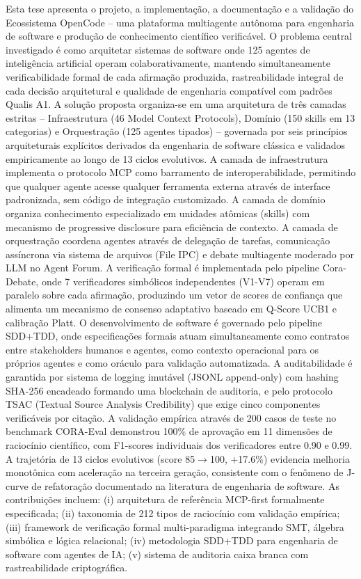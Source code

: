 \documentclass[12pt,a4paper,sumario=tradicional,openany]{abntex2}
\begin{document}
Esta tese apresenta o projeto, a implementação, a documentação e a validação do Ecossistema OpenCode -- uma plataforma multiagente autônoma para engenharia de software e produção de conhecimento científico verificável. O problema central investigado é como arquitetar sistemas de software onde 125 agentes de inteligência artificial operam colaborativamente, mantendo simultaneamente verificabilidade formal de cada afirmação produzida, rastreabilidade integral de cada decisão arquitetural e qualidade de engenharia compatível com padrões Qualis A1. A solução proposta organiza-se em uma arquitetura de três camadas estritas -- Infraestrutura (46 Model Context Protocols), Domínio (150 skills em 13 categorias) e Orquestração (125 agentes tipados) -- governada por seis princípios arquiteturais explícitos derivados da engenharia de software clássica e validados empiricamente ao longo de 13 ciclos evolutivos. A camada de infraestrutura implementa o protocolo MCP como barramento de interoperabilidade, permitindo que qualquer agente acesse qualquer ferramenta externa através de interface padronizada, sem código de integração customizado. A camada de domínio organiza conhecimento especializado em unidades atômicas (skills) com mecanismo de progressive disclosure para eficiência de contexto. A camada de orquestração coordena agentes através de delegação de tarefas, comunicação assíncrona via sistema de arquivos (File IPC) e debate multiagente moderado por LLM no Agent Forum. A verificação formal é implementada pelo pipeline Cora-Debate, onde 7 verificadores simbólicos independentes (V1-V7) operam em paralelo sobre cada afirmação, produzindo um vetor de scores de confiança que alimenta um mecanismo de consenso adaptativo baseado em Q-Score UCB1 e calibração Platt. O desenvolvimento de software é governado pelo pipeline SDD+TDD, onde especificações formais atuam simultaneamente como contratos entre stakeholders humanos e agentes, como contexto operacional para os próprios agentes e como oráculo para validação automatizada. A auditabilidade é garantida por sistema de logging imutável (JSONL append-only) com hashing SHA-256 encadeado formando uma blockchain de auditoria, e pelo protocolo TSAC (Textual Source Analysis Credibility) que exige cinco componentes verificáveis por citação. A validação empírica através de 200 casos de teste no benchmark CORA-Eval demonstrou 100\% de aprovação em 11 dimensões de raciocínio científico, com F1-scores individuais dos verificadores entre 0.90 e 0.99. A trajetória de 13 ciclos evolutivos (score 85$\rightarrow$100, +17.6\%) evidencia melhoria monotônica com aceleração na terceira geração, consistente com o fenômeno de J-curve de refatoração documentado na literatura de engenharia de software. As contribuições incluem: (i) arquitetura de referência MCP-first formalmente especificada; (ii) taxonomia de 212 tipos de raciocínio com validação empírica; (iii) framework de verificação formal multi-paradigma integrando SMT, álgebra simbólica e lógica relacional; (iv) metodologia SDD+TDD para engenharia de software com agentes de IA; (v) sistema de auditoria caixa branca com rastreabilidade criptográfica.
\end{document}
